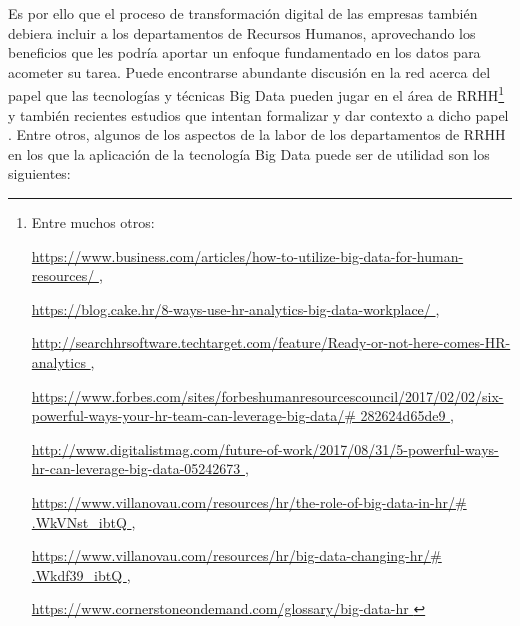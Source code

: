 Es por ello que el proceso de transformación digital de las empresas también
debiera incluir a los departamentos de Recursos Humanos, aprovechando los beneficios 
que les podría aportar un enfoque fundamentado en los datos para acometer su tarea.
Puede encontrarse abundante discusión en la red acerca del papel que las tecnologías y
técnicas Big Data pueden jugar en el área de RRHH\footnote{Entre muchos otros:

\noindent\url{https://www.business.com/articles/how-to-utilize-big-data-for-human-resources/ }, 

\noindent\url{https://blog.cake.hr/8-ways-use-hr-analytics-big-data-workplace/ }, 

\noindent\url{http://searchhrsoftware.techtarget.com/feature/Ready-or-not-here-comes-HR-analytics }, 

\noindent\url{https://www.forbes.com/sites/forbeshumanresourcescouncil/2017/02/02/six-powerful-ways-your-hr-team-can-leverage-big-data/\# 282624d65de9 }, 

\noindent\url{http://www.digitalistmag.com/future-of-work/2017/08/31/5-powerful-ways-hr-can-leverage-big-data-05242673 }, 

\noindent\url{https://www.villanovau.com/resources/hr/the-role-of-big-data-in-hr/\# .WkVNst_ibtQ }, 

\noindent\url{https://www.villanovau.com/resources/hr/big-data-changing-hr/\# .Wkdf39_ibtQ }, 

\noindent\url{https://www.cornerstoneondemand.com/glossary/big-data-hr }
} y también recientes estudios que intentan formalizar y dar contexto a dicho papel \cite{libro_rrhh}.
Entre otros, algunos de los aspectos de la labor de los departamentos de RRHH en los que
la aplicación de la tecnología Big Data puede ser de utilidad son los siguientes:
